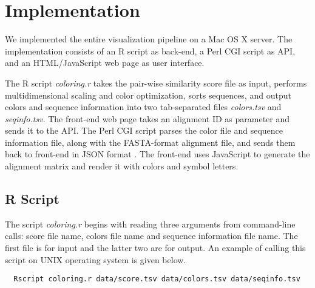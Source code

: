 \chapter{Implementation}\label{chap:Implementation}

We implemented the entire visualization pipeline on a Mac OS X server. The implementation consists of an R script as back-end, a Perl CGI script as API, and an HTML/JavaScript web page as user interface.

The R script \emph{coloring.r} takes the pair-wise similarity score file as input, performs multidimensional scaling and color optimization, sorts sequences, and output colors and sequence information into two tab-separated files \emph{colors.tsv} and \emph{seqinfo.tsv}. The front-end web page takes an alignment ID as parameter and sends it to the API. The Perl CGI script parses the color file and sequence information file, along with the FASTA-format alignment file, and sends them back to front-end in JSON format \cite{crockford2006application}. The front-end uses JavaScript to generate the alignment matrix and render it with colors and symbol letters.

\section{R Script}

The script \emph{coloring.r} begins with reading three arguments from command-line calls: score file name, colors file name and sequence information file name. The first file is for input and the latter two are for output. An example of calling this script on UNIX operating system is given below.
\begin{verbatim}
  Rscript coloring.r data/score.tsv data/colors.tsv data/seqinfo.tsv
\end{verbatim}

